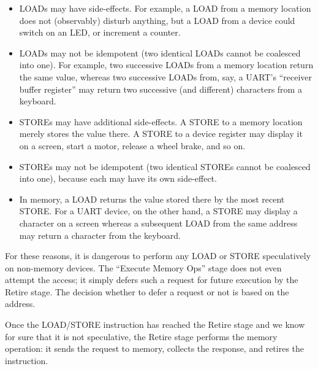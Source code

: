 \begin{itemize}

  \item LOADs may have side-effects.  For example, a LOAD from a
    memory location does not (observably) disturb anything, but a LOAD
    from a device could switch on an LED, or increment a counter.

  \item LOADs may not be idempotent (two identical LOADs cannot be
    coalesced into one).  For example, two successive LOADs from a
    memory location return the same value, whereas two successive
    LOADs from, say, a UART's ``receiver buffer register'' may return
    two successive (and different) characters from a keyboard.

  \item STOREs may have additional side-effects.  A STORE to a memory
    location merely stores the value there.  A STORE to a device
    register may display it on a screen, start a motor, release a
    wheel brake, and so on.

  \item STOREs may not be idempotent (two identical STOREs cannot be
    coalesced into one), because each may have its own side-effect.

  \item In memory, a LOAD returns the value stored there by the most
    recent STORE.  For a UART device, on the other hand, a STORE may
    display a character on a screen whereas a subsequent LOAD from the
    same address may return a character from the keyboard.

\end{itemize}

For these reasons, it is dangerous to perform any LOAD or STORE
speculatively on non-memory devices.  The ``Execute Memory Ops'' stage
does not even attempt the access; it simply defers such a request for
future execution by the Retire stage.  The decision whether to defer a
request or not is based on the address.

Once the LOAD/STORE instruction has reached the Retire stage and we
know for sure that it is not speculative, the Retire stage performs
the memory operation: it sends the request to memory, collects the
response, and retires the instruction.






